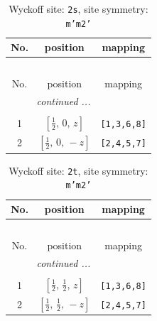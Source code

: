 \documentclass[fleqn,8pt]{jsarticle}
\begin{document}
\renewcommand{\arraystretch}{1.2}
\begin{longtable}{ccc}
\caption{Wyckoff site: {\tt 2s}, site symmetry: {\tt m'm2'}}
 \\
 \hline \hline
No. & position & mapping \\ \hline \endfirsthead

\multicolumn{2}{l}{\tablename\ \thetable{}} \\
 \hline \hline
No. & position & mapping \\ \hline \endhead

 \hline \hline
\multicolumn{2}{r}{\footnotesize\it continued ...} \\ \endfoot

 \hline \hline
\multicolumn{2}{r}{} \\ \endlastfoot

1 & $\left[ \frac{1}{2},\, 0,\, z \right]$ & {\tt [1,3,6,8]} \\ \hline
2 & $\left[ \frac{1}{2},\, 0,\, - z \right]$ & {\tt [2,4,5,7]} \\
\end{longtable}
\renewcommand{\arraystretch}{1.2}
\begin{longtable}{ccc}
\caption{Wyckoff site: {\tt 2t}, site symmetry: {\tt m'm2'}}
 \\
 \hline \hline
No. & position & mapping \\ \hline \endfirsthead

\multicolumn{2}{l}{\tablename\ \thetable{}} \\
 \hline \hline
No. & position & mapping \\ \hline \endhead

 \hline \hline
\multicolumn{2}{r}{\footnotesize\it continued ...} \\ \endfoot

 \hline \hline
\multicolumn{2}{r}{} \\ \endlastfoot

1 & $\left[ \frac{1}{2},\, \frac{1}{2},\, z \right]$ & {\tt [1,3,6,8]} \\ \hline
2 & $\left[ \frac{1}{2},\, \frac{1}{2},\, - z \right]$ & {\tt [2,4,5,7]} \\
\end{longtable}
\renewcommand{\arraystretch}{1.2}
\end{document}
